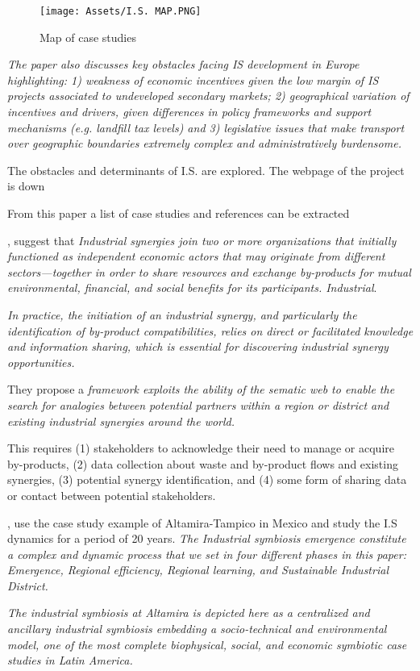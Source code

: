 \begin{figure}[h!]
    \centering
    \texttt{[image: Assets/I.S. MAP.PNG]}
    \caption{Map of case studies}
    \label{fig:casestudiesmap}
\end{figure}


\textit{The paper also discusses key obstacles facing IS development in Europe highlighting: 1) weakness of economic incentives given the low margin of IS projects associated to undeveloped secondary markets; 2) geographical variation of incentives and drivers, given differences in policy frameworks and support mechanisms (e.g. landfill tax levels) and 3) legislative issues that make transport over geographic boundaries extremely complex and administratively burdensome.}\par

The obstacles and determinants of I.S. are explored. The webpage of the project is down\par

From this paper a list of case studies and references can be extracted


\textbf{}\par
\textcite{Ghali2019}, suggest that \textit{Industrial synergies join two or more organizations that initially functioned as independent economic actors that may originate from different sectors—together in order to share resources and exchange by-products for mutual environmental, financial, and social benefits for its participants. Industrial}.\par
\textit{In practice, the initiation of an industrial synergy, and particularly the identification of by-product compatibilities, relies on direct or facilitated knowledge and information sharing, which is essential for discovering industrial synergy opportunities.}\par
They propose a \textit{framework exploits the ability of the sematic web to enable the search for analogies between potential partners within a region or district and existing industrial synergies around the world.}\par
This requires (1) stakeholders to acknowledge their need to manage or acquire by-products, (2) data collection about waste and by-product flows and existing synergies, (3) potential synergy identification, and (4) some form of sharing data or contact between potential stakeholders.

\textbf{}\par
\textcite{Morales2019}, use the case study example of Altamira-Tampico in Mexico and study the I.S dynamics for a period of 20 years. \textit{The Industrial symbiosis emergence constitute a complex and dynamic process that we set in four different phases in this paper: Emergence, Regional efficiency, Regional learning, and Sustainable Industrial District.}\par
\textit{The industrial symbiosis at Altamira is depicted here as a centralized and ancillary industrial symbiosis embedding a socio-technical and environmental model, one of the most complete biophysical, social, and economic symbiotic case studies in Latin America.}\par



